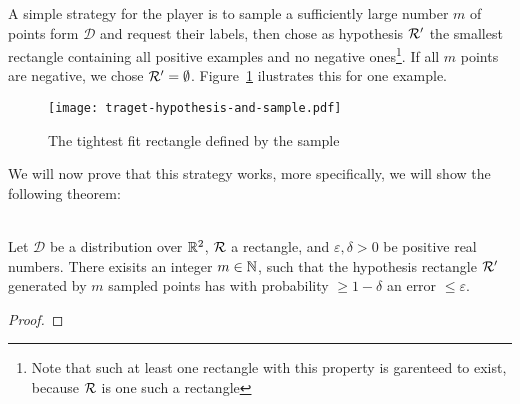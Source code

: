     A simple strategy for the player is to sample a sufficiently large number \(m\) of points form \(\mathcal{D}\) and request their labels, then chose as hypothesis \(\mathcal{R}^\prime\) the smallest rectangle containing all positive examples and no negative ones\footnote{Note that such at least one rectangle with this property is garenteed to exist, because \(\mathcal{R}\) is one such a rectangle}. If all \(m\) points are negative, we chose \(\mathcal{R}^\prime = \emptyset\). Figure~\ref{fig:traget-hypothesis-and-sample} ilustrates this for one example.

    \begin{figure}
        \begin{center}
            \texttt{[image: traget-hypothesis-and-sample.pdf]}
        \end{center}
        \caption{The tightest fit rectangle defined by the sample}
        \label{fig:traget-hypothesis-and-sample}
    \end{figure}

    We will now prove that this strategy works, more specifically, we will show the following theorem:

    \begin{theorem}
        \ \\
        Let \(\mathcal{D}\) be a distribution over \(\mathbb{R}^2\), \(\mathcal{R}\) a rectangle, and \(\varepsilon, \delta>0\) be positive real numbers.
        There exisits an integer \(m\in\mathbb{N}\), such that the hypothesis rectangle \(\mathcal{R}^\prime\) generated by \(m\) sampled points has with probability \(\ge 1 - \delta\) an error \(\le\varepsilon\).
    \end{theorem}

    \begin{proof}
        
    \end{proof}